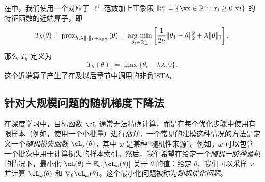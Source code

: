 \documentclass[../../book-main_zh.tex]{subfiles}
\begin{document}
\begin{example}\label{example:prox-of-nonnegative-l1}
    在中，我们使用一个对应于 \(\ell^{1}\) 范数加上正象限 \(\R_{+}^{n} \doteq \{\vx \in \R^{n} \colon x_{i} \geq 0\ \forall i\}\) 的特征函数的近端算子，即
    \begin{equation}
        T_{h}(\theta) \doteq \prox_{h, \lambda\norm{\cdot}_{1} + \chi_{\R_{+}^{n}}}(\theta) = \argmin_{\theta_{1} \in \R_{+}^{n}}\bs{\frac{1}{2h}\norm{\theta_{1} - \theta}_{2}^{2} + \lambda\norm{\theta}_{1}},
    \end{equation}
    那么 \(T_{h}\) 定义为
    \begin{equation}
        T_{h}(\theta)_{i} \doteq \max\{\theta_{i} - h\lambda, 0\}.
    \end{equation}
    这个近端算子产生了在及以后章节中调用的非负ISTA。
\end{example}



\subsection{针对大规模问题的随机梯度下降法}


在深度学习中，目标函数 \(\cL\) 通常无法精确计算，而是在每个优化步骤中使用有限样本（例如，使用一个小批量）进行\textit{估计}。一个常见的建模这种情况的方法是定义一个\textit{随机损失函数} \(\cL_{\omega}(\theta)\)，其中 \(\omega\) 是某种“随机性来源”。例如，\(\omega\) 可以包含一个批次中用于计算损失的样本索引。然后，我们希望在给定一个\textit{随机一阶神谕机}的情况下，最小化 \(\cL(\theta) \doteq \Ex_{\omega}[\cL_{\omega}(\theta)]\) 关于 \(\theta\) 的值：给定 \(\theta\)，我们可以采样 \(\omega\) 并计算 \(\cL_{\omega}(\theta)\) 和 \(\nabla_{\theta}\cL_{\omega}(\theta)\)。这个最小化问题被称为\textit{随机优化问题}。
\end{document}
